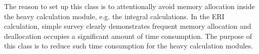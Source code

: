 The reason to set up this class is to attentionally avoid memory allocation
inside the heavy calculation module, e.g. the integral calculations. In the 
ERI calculation, simple survey clearly demonstrates frequent memory allocation
and deallocation occupies a significant amount of time consumption. The purpose
of this class is to reduce such time consumption for the heavy calculation
modules.

\begin{comment}
 
HistDataMan Class is moved to the math folder, since it handles all of 
matrix or vector<Double> type information. It does not belong here.

\section{HistDataMan Class}
HistDataMan represents ``Historical Data manipulation''. This class 
is used to manipulate large size data such as matrix, vectors etc.
The user of the class can choose either to store the data in the 
memory, or store the data on the disk for future recovery. This class
provides a generic interface so that user need not to know where the 
data stores.

The HistDataMan class is actually some compromise between the reality and the
ideal programming styles. Ideally the data is better ``localized'', the
HistDataMan breaks it by setting up data in one place and use it in the other
place. Therefore it cause a potential ``coupling'' between the two places of
the codes.  However; to repeatedly calculate large data could be obviously a
drawback for programs (see \ref{suggestion_Implementation_data} for more
information).  Therefore, this class is used to hold these data who is
expensive for repeat calculation, and would be used in several different
places. This class is trying to monitor the creation/use of the data, so that
to minimize the potential hazard introduced by creating/using data in different
places.

It's strongly recommended that HistDataMan should be use with a good reason,
else it's better to use another way to skip the use of HistDataMan class.

\subsection{Rules for HistDataMan Class}
%
%
For safely constructing/using the data. HistDataMan class has a rule that 
the data inside this class is constructed ``only once''. The class user
could recover the data in the following codes, but the rewritten action
for same section data is prohibited. By setting up this rule, HistDataMan
class try to avoid the situation that the same data could be changed 
in many different places.


\end{comment}
